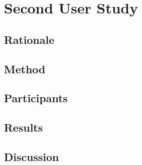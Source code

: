 
\chapter{Second User Study}
\label{cha:experimenttwo}

\section{Rationale}
\label{sec:experimenttworationale}

\section{Method}
\label{sec:experimenttwoprocedure}

\section{Participants}
\label{sec:experimenttwoparticipants}

\section{Results}
\label{sec:experimenttworesults}

\section{Discussion}
\label{sec:experimenttwodiscussion}


